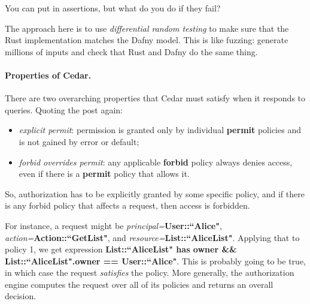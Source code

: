 \documentclass[11pt]{article}
\begin{document}
You can put in assertions, but what do you do if they fail?

The approach here is to use \emph{differential random testing} to make sure that the
Rust implementation matches the Dafny model. This is like fuzzing: generate millions of inputs
and check that Rust and Dafny do the same thing.

\paragraph{Properties of Cedar.} There are two overarching properties that Cedar must satisfy
when it responds to queries. Quoting the post again:
\begin{itemize}[noitemsep]
\item \emph{explicit permit}: permission is granted only by individual \textbf{permit} policies and is not gained by error or default;
\item \emph{forbid overrides permit}: any applicable \textbf{forbid} policy always denies access, even if there is a \textbf{permit} policy that allows it.
\end{itemize}
So, authorization has to be explicitly granted by some specific policy, and if there is any forbid policy that affects a request, then access is forbidden.

For instance, a request might be \textit{principal=}\textbf{User::``Alice"}, \textit{action=}\textbf{Action::``GetList"}, and \textit{resource=}\textbf{List::``AliceList"}. Applying that to policy 1, we get expression \textbf{List::``AliceList" has owner \&\& List::``AliceList".owner == User::``Alice"}. This is probably going to be true, in which case the request \emph{satisfies} the policy. More generally, the authorization engine computes the request over all of its policies and returns an overall decision.
\end{document}
